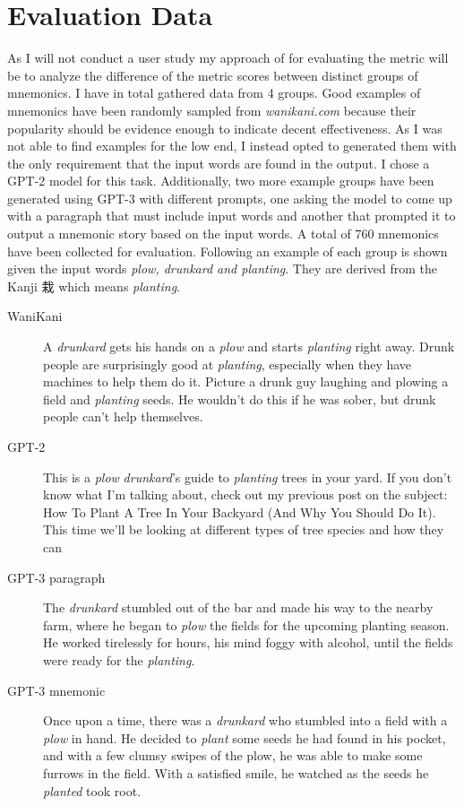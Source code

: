 \section{Evaluation Data} \label{sec:body_evaluation_data}

As I will not conduct a user study my approach of for evaluating the metric will be to analyze the difference of the metric scores between distinct groups of mnemonics. I have in total gathered data from 4 groups. Good examples of mnemonics have been randomly sampled from 
\emph{wanikani.com} because their popularity should be evidence enough to indicate decent effectiveness. As I was not able to find examples for the low end, I instead opted to generated them with the only requirement that the input words are found in the output. I chose a GPT-2 model for this task.  Additionally, two more example groups have been generated using GPT-3 with different prompts, one asking the model to come up with a paragraph that must include input words and another that prompted it to output a mnemonic story based on the input words. A total of 760 mnemonics have been collected for evaluation. Following an example of each group is shown given the input words \emph{plow, drunkard and planting}. They are derived from the Kanji 栽 which means \emph{planting}.
\begin{description}
    \item[WaniKani] A \emph{drunkard} gets his hands on a \emph{plow} and starts \emph{planting} right away. Drunk people are surprisingly good at \emph{planting}, especially when they have machines to help them do it. Picture a drunk guy laughing and plowing a field and \emph{planting} seeds. He wouldn't do this if he was sober, but drunk people can't help themselves.
    \item[GPT-2]  This is a \emph{plow} \emph{drunkard}'s guide to \emph{planting} trees in your yard. If you don't know what I'm talking about, check out my previous post on the subject: How To Plant A Tree In Your Backyard (And Why You Should Do It). This time we'll be looking at different types of tree species and how they can
    \item[GPT-3 paragraph] The \emph{drunkard} stumbled out of the bar and made his way to the nearby farm, where he began to \emph{plow} the fields for the upcoming planting season. He worked tirelessly for hours, his mind foggy with alcohol, until the fields were ready for the \emph{planting}.
    \item[GPT-3 mnemonic] Once upon a time, there was a \emph{drunkard} who stumbled into a field with a \emph{plow} in hand. He decided to \emph{plant} some seeds he had found in his pocket, and with a few clumsy swipes of the plow, he was able to make some furrows in the field. With a satisfied smile, he watched as the seeds he \emph{planted} took root. 
\end{description}
